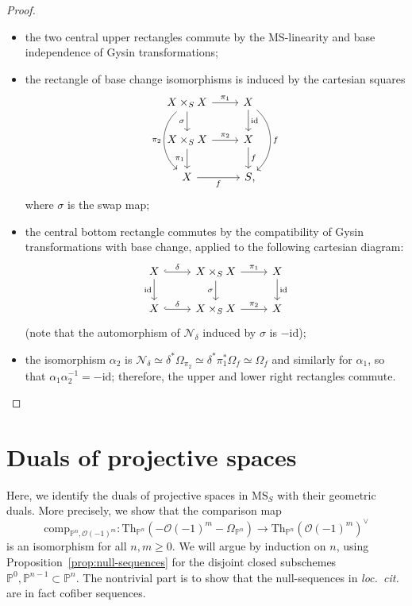\documentclass{amsart}
\numberwithin{equation}{section}
\theoremstyle{plain}
\theoremstyle{definition}
\let\scr=\mathcal
\let\bb=\mathbb
\let\rm=\mathrm
\def\P{\bb P}
\def\id{\mathrm{id}}
\def\Th{\mathrm{Th}}
\def\MS{\mathrm{MS}}
\begin{document}
\begin{proof}
\begin{itemize}
		\item the two central upper rectangles commute by the $\MS$-linearity and base independence of Gysin transformations;
		\item the rectangle of base change isomorphisms is induced by the cartesian squares
		\[
		\begin{tikzcd}
			X\times_SX \ar{d}[swap]{\sigma} \ar{r}{\pi_1} \ar[bend right=50]{dd}[swap]{\pi_2} & X \ar{d}{\id} \ar[bend left=50]{dd}{f} \\
			X\times_SX \ar{d}[swap]{\pi_1} \ar{r}{\pi_2} & X \ar{d}{f} \\
			X \ar{r}[swap]{f} & S\rlap,
		\end{tikzcd}
		\]
		where $\sigma$ is the swap map;
		\item the central bottom rectangle commutes by the compatibility of Gysin transformations with base change, applied to the following cartesian diagram:
		\[
		\begin{tikzcd}
			X \ar[hook]{r}{\delta} \ar{d}[swap]{\id} & X\times_SX \ar{d}[swap]{\sigma} \ar{r}{\pi_1} & X \ar{d}{\id} \\
			X \ar[hook]{r}{\delta} & X\times_SX \ar{r}{\pi_2} & X
		\end{tikzcd}
		\]
		(note that the automorphism of $\scr N_\delta$ induced by $\sigma$ is $-\id$);
		\item the isomorphism $\alpha_2$ is $\scr N_\delta\simeq \delta^*\Omega_{\pi_2}\simeq \delta^*\pi_1^*\Omega_f\simeq\Omega_f$ and similarly for $\alpha_1$, so that $\alpha_1\alpha_2^{-1}=-\id$; therefore, the upper and lower right rectangles commute.\qedhere
	\end{itemize}
\end{proof}


\section{Duals of projective spaces}
\label{sec:Pdual}

Here, we identify the duals of projective spaces in $\MS_S$ with their geometric duals. More precisely, we show that the comparison map
\begin{equation*}
\rm{comp}_{\P^n,\scr O(-1)^m} \colon \Th_{\P^n} (- \scr O(-1)^m - \Omega_{\P^n})\to \Th_{\P^n}(\scr O(-1)^m)^\vee
\end{equation*}
is an isomorphism for all $n,m \geq 0$. We will argue by induction on $n$, using Proposition~\ref{prop:null-sequences} for the disjoint closed subschemes $\P^0,\P^{n-1}\subset \P^n$. The nontrivial part is to show that the null-sequences in \emph{loc.\ cit.} are in fact cofiber sequences.
\end{document}
